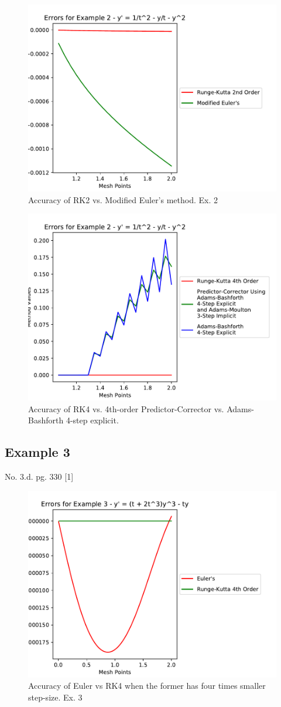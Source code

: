 \documentclass[11pt]{article}	%
\begin{document}
\begin{figure}[H]
\centering
\includegraphics[width=.4\textwidth]{rk2_meuler_2}
\caption{Accuracy of RK2 vs. Modified Euler's method. Ex. 2}
\label{fig:rk2_meuler_2}
\end{figure}

\begin{figure}[H]
\centering
\includegraphics[width=.4\textwidth]{rk4_predictor_ab4_2}
\caption{Accuracy of RK4 vs. 4th-order Predictor-Corrector vs. Adams-Bashforth 4-step explicit.}
\label{fig:rk4_predictor_ab4_2}
\end{figure}
\clearpage
\newpage
\subsection{Example 3}
No. 3.d. pg. 330 [1]


\begin{figure}[H]
\centering
\includegraphics[width=.45\textwidth]{euler_rk4_3}
\caption{Accuracy of Euler vs RK4 when the former has four times smaller step-size. Ex. 3}
\label{fig:euler_rk4_3}
\end{figure}
\end{document}

